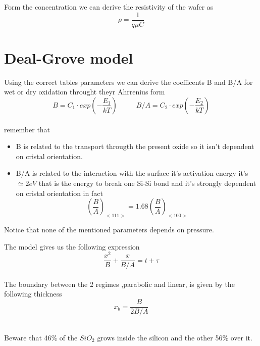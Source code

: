 \vspace{3mm}

Form the concentration we can derive the resistivity of the wafer as
\begin{equation}
\rho=\frac{1}{q\mu C}
\end{equation}






\section{Deal-Grove model}
Using the correct tables parameters we can derive the coefficents B and B/A for wet or dry oxidation throught theyr Ahrrenius form 
\begin{equation}
B=C_1\cdot exp\left(-\frac{E_1}{kT} \right) \ \ \ \ \ \ \ \ \ \ \ \ B/A=C_2\cdot exp\left(-\frac{E_2}{kT} \right)
\end{equation}
\\
remember that 
\begin{itemize}
\item B is related to the transport througth the present oxide so it isn't dependent on cristal orientation.
\item B/A is related to the interaction with the surface it's activation energy it's $\simeq 2eV$ that is the energy to break one Si-Si bond and it's strongly dependent on cristal orientation in fact
\begin{equation}
\left(\frac{B}{A}\right)_{<111>}=1.68\left(\frac{B}{A}\right)_{<100>}
\end{equation}
\end{itemize}
Notice that none of the mentioned parameters depends on pressure.\\

\vspace{5mm}

The model gives us the following expression
\begin{equation}
\frac{x^2}{B}+\frac{x}{B/A}=t+\tau
\end{equation}
\\
The boundary between the 2 regimes ,parabolic and linear, is given by the following thickness
\begin{equation}
x_b=\frac{B}{2B/A}
\end{equation}
\\
\vspace{5mm}

Beware that 46\% of the $SiO_2$ grows inside the silicon and the other 56\% over it.\\



